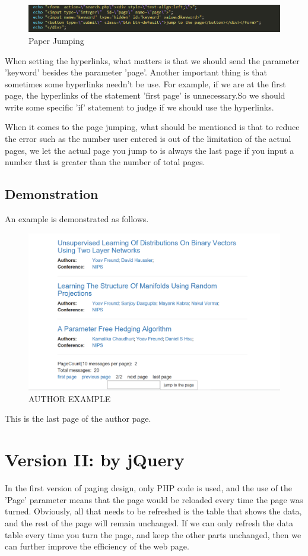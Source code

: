 \documentclass{book}
\begin{document}
\begin{figure}[H]
\centering
\includegraphics[scale=0.35]{img/dsw_input.png}
\caption{Paper Jumping}
\end{figure}

When setting the hyperlinks, what matters is that we should send the parameter 'keyword' besides the parameter 'page'. Another important thing is that sometimes some hyperlinks needn't be use. For example, if we are at the first page, the hyperlinks of the statement 'first page' is unnecessary.So we should write some specific 'if' statement to judge if we should use the hyperlinks.

When it comes to the page jumping, what should be mentioned is that to reduce the error such as the number user entered is out of the limitation of the actual pages, we let the actual page you jump to is always the last page if you input a number that is greater than the number of total pages.

\subsection{Demonstration}
An example is demonstrated as follows.
\begin{figure}[H]
\centering
\includegraphics[scale=0.15]{img/dsw_ex.png}
\caption{AUTHOR EXAMPLE}
\end{figure}
This is the last page of the author page.

\section{Version II: by jQuery}
In the first version of paging design, only PHP code is used, and the use of the 'Page' parameter means that the page would be reloaded every time the page was turned. Obviously, all that needs to be refreshed is the table that shows the data, and the rest of the page will remain unchanged. If we can only refresh the data table every time you turn the page, and keep the other parts unchanged, then we can further improve the efficiency of the web page. 
\end{document}
